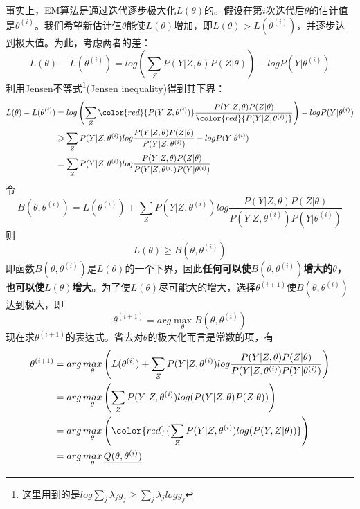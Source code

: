 事实上，EM算法是通过迭代逐步极大化$L(\theta)$的。假设在第$i$次迭代后$\theta$的估计值是$\theta^{(i)}$。我们希望新估计值$\theta$能使$L(\theta)$增加，即$L(\theta)>L(\theta^{(i)})$，并逐步达到极大值。为此，考虑两者的差：
\begin{equation}
	L(\theta)-L(\theta^{(i)})=log \left(\sum_{Z}P(Y|Z,\theta)P(Z|\theta) \right)-log P(Y|\theta^{(i)})
\end{equation}
利用Jensen不等式\footnote{这里用到的是$log\sum_{j}\lambda_jy_j\geqslant \sum_{j}\lambda_jlogy_j$}(Jensen inequality)得到其下界：
\begin{equation}
	\begin{aligned}
		L(\theta)-L(\theta^{(i)})&=log \left(\sum_{Z}{\color{red}{P(Y|Z,\theta^{(i)})}} \frac{P(Y|Z,\theta)P(Z|\theta)}{{\color{red}{P(Y|Z,\theta^{(i)})}}}  \right)-log P(Y|\theta^{(i)})\\
		&\geqslant \sum_{Z} P(Y|Z,\theta^{(i)})log\frac{P(Y|Z,\theta)P(Z|\theta)}{P(Y|Z,\theta^{(i)})}-log P(Y|\theta^{(i)})\\
		&=\sum_{Z}P(Y|Z,\theta^{(i)})log\frac{P(Y|Z,\theta)P(Z|\theta)}{P(Y|Z,\theta^{(i)})P(Y|\theta^{(i)})}
	\end{aligned}
\end{equation}
令
\begin{equation}
	B(\theta,\theta^{(i)})=L(\theta^{(i)})+\sum_{Z}P(Y|Z,\theta^{(i)})log\frac{P(Y|Z,\theta)P(Z|\theta)}{P(Y|Z,\theta^{(i)})P(Y|\theta^{(i)})}
\end{equation}
则
\begin{equation}
	L(\theta)\geqslant B(\theta,\theta^{(i)})
\end{equation}
即函数$B(\theta,\theta^{(i)})$是$L(\theta)$的一个下界，因此\textbf{任何可以使$B(\theta,\theta^{(i)})$增大的$\theta$，也可以使$L(\theta)$增大}。为了使$L(\theta)$尽可能大的增大，选择$\theta^{(i+1)}$使$B(\theta,\theta^{(i)})$达到极大，即
\begin{equation}
	\theta^{(i+1)}=arg \mathop
	{max}\limits_{\theta}B(\theta,\theta^{(i)})
\end{equation}
现在求$\theta^{(i+1)}$的表达式。省去对$\theta$的极大化而言是常数的项，有
\begin{equation}
\label{目标}
	\begin{aligned}
		\theta^{(i+1)}&=arg \mathop
		{max}\limits_{\theta}\left( L(\theta^{(i)})+\sum_{Z}P(Y|Z,\theta^{(i)})log\frac{P(Y|Z,\theta)P(Z|\theta)}{P(Y|Z,\theta^{(i)})P(Y|\theta^{(i)})} \right)\\
		&=arg \mathop
		{max}\limits_{\theta}\left( \sum_{Z}P(Y|Z,\theta^{(i)})log( P(Y|Z,\theta)P(Z|\theta)) \right)\\
		&=arg \mathop
		{max}\limits_{\theta}\left( {\color{red}{\sum_{Z}P(Y|Z,\theta^{(i)})log( P(Y,Z|\theta))}} \right)\\
		&=arg \mathop
		{max}\limits_{\theta}\underline{Q(\theta,\theta^{(i)})}
	\end{aligned}
\end{equation}
